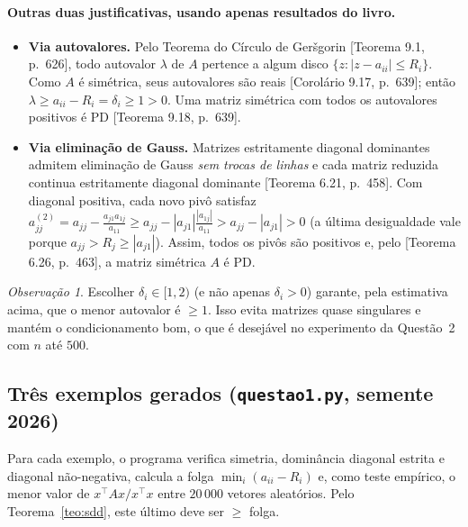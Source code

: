 \documentclass{article}
\newcommand{\T}{^{\top}}
\newcommand{\burden}[1]{\textsf{\footnotesize[#1]}}
\theoremstyle{remark}
\newtheorem{obs}{Observação}
\begin{document}
\paragraph{Outras duas justificativas, usando apenas resultados do livro.}
\begin{itemize}
\item \textbf{Via autovalores.} Pelo Teorema do Círculo de Geršgorin \burden{Teorema 9.1, p.~626}, todo autovalor
$\lambda$ de $A$ pertence a algum disco $\{z:|z-a_{ii}|\le R_i\}$. Como $A$ é simétrica, seus autovalores são reais
\burden{Corolário 9.17, p.~639}; então $\lambda\ge a_{ii}-R_i=\delta_i\ge1>0$. Uma matriz simétrica com todos os
autovalores positivos é PD \burden{Teorema 9.18, p.~639}.
\item \textbf{Via eliminação de Gauss.} Matrizes estritamente diagonal dominantes admitem eliminação de Gauss
\emph{sem trocas de linhas} e cada matriz reduzida continua estritamente diagonal dominante
\burden{Teorema 6.21, p.~458}. Com diagonal positiva, cada novo pivô satisfaz
$a^{(2)}_{jj}=a_{jj}-\frac{a_{j1}a_{1j}}{a_{11}}\ge a_{jj}-|a_{j1}|\frac{|a_{1j}|}{a_{11}}>a_{jj}-|a_{j1}|>0$
(a última desigualdade vale porque $a_{jj}>R_j\ge|a_{j1}|$). Assim, todos os pivôs são positivos e, pelo
\burden{Teorema 6.26, p.~463}, a matriz simétrica $A$ é PD.
\end{itemize}

\begin{obs}
Escolher $\delta_i\in[1,2)$ (e não apenas $\delta_i>0$) garante, pela estimativa acima, que o menor autovalor é
$\ge 1$. Isso evita matrizes quase singulares e mantém o condicionamento bom, o que é desejável no experimento
da Questão~2 com $n$ até $500$.
\end{obs}

\subsection{Três exemplos gerados (\texttt{questao1.py}, semente 2026)}
Para cada exemplo, o programa verifica simetria, dominância diagonal estrita e diagonal não-negativa,
calcula a folga $\min_i(a_{ii}-R_i)$ e, como teste empírico, o menor valor de $x\T Ax/x\T x$ entre
$20\,000$ vetores aleatórios. Pelo Teorema~\ref{teo:sdd}, este último deve ser $\ge$ folga.
\end{document}

